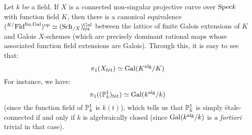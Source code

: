         \begin{example} \label{example: etale_fundamental_group_of_a_curve}
            Let $k$ be a field. If $X$ is a connected non-singular projective curve over $\Spec k$ with function field $K$, then there is a canonical equivalence $({}^{K/}\Fld^{\fin, \Gal})^{\op} \cong (\Sch_{/X})_{\fet}^{\Gal}$ between the lattice of finite Galois extensions of $K$ and Galois $X$-schemes (which are precisely dominant rational maps whose associated function field extensions are Galois). Through this, it is easy to see that:
                $$\pi_1(X_{\fet}) \cong \Gal(K^{\alg}/K)$$
            For instance, we have:
                $$\pi_1((\P^1_k)_{\fet}) \cong \Gal(k^{\alg}/k)$$
            (since the function field of $\P^1_k$ is $k(t)$), which tells us that $\P^1_k$ is simply \'etale-connected if and only if $k$ is algebraically closed (since $\Gal(k^{\alg}/k)$ is \textit{a fortiori} trivial in that case). 
            

\end{example}
